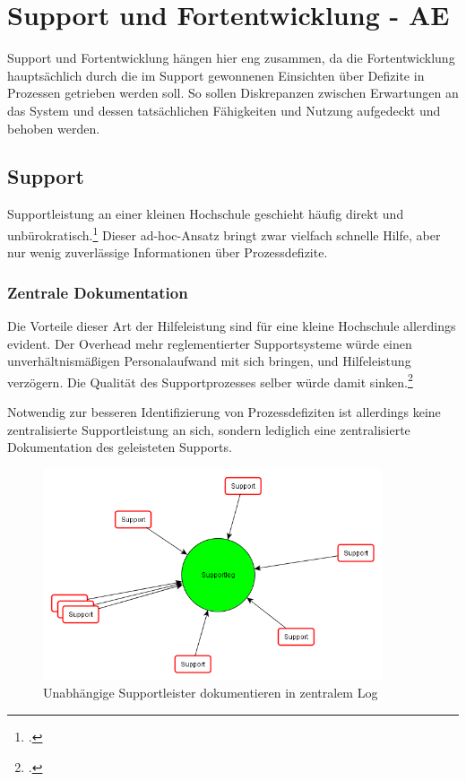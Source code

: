 \section{Support und Fortentwicklung - AE}
Support und Fortentwicklung hängen hier eng zusammen, da die Fortentwicklung 
hauptsächlich durch die im Support gewonnenen Einsichten über Defizite in Prozessen 
getrieben werden soll. So sollen Diskrepanzen zwischen Erwartungen an das System und 
dessen tatsächlichen Fähigkeiten und Nutzung aufgedeckt und behoben werden.

\subsection{Support}
Supportleistung an einer kleinen Hochschule geschieht häufig direkt und 
unbürokratisch.\footcite{gunter_muller_interview} Dieser ad-hoc-Ansatz bringt 
zwar vielfach schnelle Hilfe, aber nur wenig zuverlässige Informationen über Prozessdefizite.

\subsubsection{Zentrale Dokumentation}
Die Vorteile dieser Art der Hilfeleistung sind für eine kleine Hochschule allerdings evident. 
Der Overhead mehr reglementierter Supportsysteme würde einen unverhältnismäßigen 
Personalaufwand mit sich bringen, und Hilfeleistung verzögern. Die Qualität des 
Supportprozesses selber würde damit sinken.\footcite{gunter_muller_interview}

Notwendig zur besseren Identifizierung von Prozessdefiziten ist allerdings keine 
zentralisierte Supportleistung an sich, sondern lediglich eine zentralisierte Dokumentation 
des geleisteten Supports.
\newpage

\begin{figure}[h!]
	\centering
	\includegraphics[width=10cm]{kapitel/gruppe3/bilder/grafik_supportlog}
	\caption{Unabhängige Supportleister dokumentieren in zentralem Log}
	\label{fig_zentraler_supportlog}
\end{figure}

